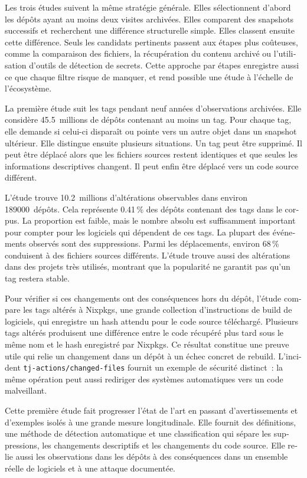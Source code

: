 \begin{otherlanguage}{french}
\begin{SingleSpace}
Les trois études suivent la même stratégie générale.
Elles sélectionnent d'abord les dépôts ayant au moins deux visites archivées.
Elles comparent des snapshots successifs et recherchent une différence structurelle simple.
Elles classent ensuite cette différence.
Seuls les candidats pertinents passent aux étapes plus coûteuses, comme la comparaison des fichiers, la récupération du contenu archivé ou l'utilisation d'outils de détection de secrets.
Cette approche par étapes enregistre aussi ce que chaque filtre risque de manquer, et rend possible une étude à l'échelle de l'écosystème.

La première étude suit les tags pendant neuf années d'observations archivées.
Elle considère \num{45,5}~millions de dépôts contenant au moins un tag.
Pour chaque tag, elle demande si celui-ci disparaît ou pointe vers un autre objet dans un snapshot ultérieur.
Elle distingue ensuite plusieurs situations.
Un tag peut être supprimé.
Il peut être déplacé alors que les fichiers sources restent identiques et que seules les informations descriptives changent.
Il peut enfin être déplacé vers un code source différent.

L'étude trouve \num{10,2}~millions d'altérations observables dans environ \num{189000}~dépôts.
Cela représente \num{0,41}\,\% des dépôts contenant des tags dans le corpus.
La proportion est faible, mais le nombre absolu est suffisamment important pour compter pour les logiciels qui dépendent de ces tags.
La plupart des événements observés sont des suppressions.
Parmi les déplacements, environ \num{68}\,\% conduisent à des fichiers sources différents.
L'étude trouve aussi des altérations dans des projets très utilisés, montrant que la popularité ne garantit pas qu'un tag restera stable.

Pour vérifier si ces changements ont des conséquences hors du dépôt, l'étude compare les tags altérés à Nixpkgs, une grande collection d'instructions de build de logiciels, qui enregistre un hash attendu pour le code source téléchargé.
Plusieurs tags altérés produisent une différence entre le code récupéré plus tard sous le même nom et le hash enregistré par Nixpkgs.
Ce résultat constitue une preuve utile qui relie un changement dans un dépôt à un échec concret de rebuild.
L'incident \texttt{tj-actions/changed-files} fournit un exemple de sécurité distinct~: la même opération peut aussi rediriger des systèmes automatiques vers un code malveillant.

Cette première étude fait progresser l'état de l'art en passant d'avertissements et d'exemples isolés à une grande mesure longitudinale.
Elle fournit des définitions, une méthode de détection automatique et une classification qui sépare les suppressions, les changements descriptifs et les changements du code source.
Elle relie aussi les observations dans les dépôts à des conséquences dans un ensemble réelle de logiciels et à une attaque documentée.


\end{SingleSpace}
\end{otherlanguage}
